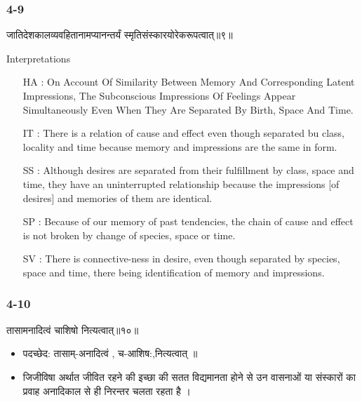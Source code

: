 \begin{frame}[fragile]\frametitle{4-9}
\begin{sanskrit}
जातिदेशकालव्यवहितानामप्यानन्तर्यं स्मृतिसंस्कारयोरेकरूपत्वात्॥९॥
\end{sanskrit}

Interpretations
\begin{itemize}	
\item [HA]: On Account Of Similarity Between Memory And Corresponding Latent Impressions, The Subconscious Impressions Of Feelings Appear Simultaneously Even When They Are Separated By Birth, Space And Time.
\item [IT]: There is a relation of cause and effect even though separated bu class, locality and time because memory and impressions are the same in form.
\item [SS]: Although desires are separated from their fulfillment by class, space and time, they have an uninterrupted relationship because the impressions [of desires] and memories of them are identical.
\item [SP]: Because of our memory of past tendencies, the chain of cause and effect is not broken by change of species, space or time.
\item [SV]: There is connective-ness in desire, even though separated by species, space and time, there being identification of memory and impressions. 
\end{itemize}
\end{frame}


\begin{frame}[fragile]\frametitle{4-10}
\begin{sanskrit}
तासामनादित्वं चाशिषो नित्यत्वात्॥१०॥
\end{sanskrit}

\begin{itemize}
\item पदच्छेद:  तासाम्-अनादित्वं , च-आशिष:,‌नित्यत्वात् ॥
\item जिजीविषा अर्थात जीवित रहने की इच्छा की सतत विद्यमानता होने से उन वासनाओं या संस्कारों का प्रवाह अनादिकाल से ही निरन्तर चलता रहता है ।
\end{itemize}
\end{frame}

